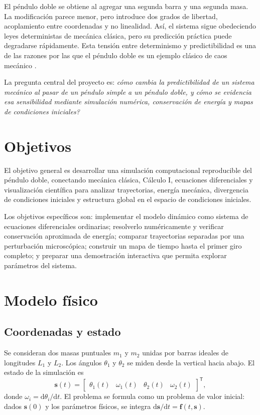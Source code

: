 \documentclass[reprint,amsmath,amssymb,aps,pra,nofootinbib,floatfix,showkeys]{revtex4-2}
\newcommand{\dd}{\mathrm{d}}
\newcommand{\vect}[1]{\bm{#1}}
\begin{document}
El p\'endulo doble se obtiene al agregar una segunda barra y una segunda masa. La modificaci\'on parece menor, pero introduce dos grados de libertad, acoplamiento entre coordenadas y no linealidad. As\'i, el sistema sigue obedeciendo leyes deterministas de mec\'anica cl\'asica, pero su predicci\'on pr\'actica puede degradarse r\'apidamente. Esta tensi\'on entre determinismo y predictibilidad es una de las razones por las que el p\'endulo doble es un ejemplo cl\'asico de caos mec\'anico \cite{heyl2008double,rafat2009dynamics}.

La pregunta central del proyecto es: \emph{\textquestiondown c\'omo cambia la predictibilidad de un sistema mec\'anico al pasar de un p\'endulo simple a un p\'endulo doble, y c\'omo se evidencia esa sensibilidad mediante simulaci\'on num\'erica, conservaci\'on de energ\'ia y mapas de condiciones iniciales?}

\section{Objetivos}

El objetivo general es desarrollar una simulaci\'on computacional reproducible del p\'endulo doble, conectando mec\'anica cl\'asica, C\'alculo I, ecuaciones diferenciales y visualizaci\'on cient\'ifica para analizar trayectorias, energ\'ia mec\'anica, divergencia de condiciones iniciales y estructura global en el espacio de condiciones iniciales.

Los objetivos espec\'ificos son: implementar el modelo din\'amico como sistema de ecuaciones diferenciales ordinarias; resolverlo num\'ericamente y verificar conservaci\'on aproximada de energ\'ia; comparar trayectorias separadas por una perturbaci\'on microsc\'opica; construir un mapa de tiempo hasta el primer giro completo; y preparar una demostraci\'on interactiva que permita explorar par\'ametros del sistema.

\section{Modelo f\'isico}

\subsection{Coordenadas y estado}

Se consideran dos masas puntuales $m_1$ y $m_2$ unidas por barras ideales de longitudes $L_1$ y $L_2$. Los \'angulos $\theta_1$ y $\theta_2$ se miden desde la vertical hacia abajo. El estado de la simulaci\'on es
\begin{equation}
    \vect{s}(t)=
    \begin{bmatrix}
    \theta_1(t) & \omega_1(t) & \theta_2(t) & \omega_2(t)
    \end{bmatrix}^{\mathsf{T}},
    \label{eq:state}
\end{equation}
donde $\omega_i=\dd\theta_i/\dd t$. El problema se formula como un problema de valor inicial: dados $\vect{s}(0)$ y los par\'ametros f\'isicos, se integra $\dd\vect{s}/\dd t=\vect{f}(t,\vect{s})$.
\end{document}
